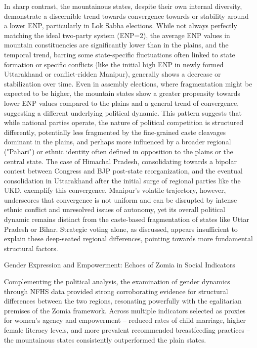 In sharp contrast, the mountainous states, despite their own internal diversity, demonstrate a discernible trend towards convergence towards or stability around a lower ENP, particularly in Lok Sabha elections. While not always perfectly matching the ideal two-party system (ENP=2), the average ENP values in mountain constituencies are significantly lower than in the plains, and the temporal trend, barring some state-specific fluctuations often linked to state formation or specific conflicts (like the initial high ENP in newly formed Uttarakhand or conflict-ridden Manipur), generally shows a decrease or stabilization over time. Even in assembly elections, where fragmentation might be expected to be higher, the mountain states show a greater propensity towards lower ENP values compared to the plains and a general trend of convergence, suggesting a different underlying political dynamic. This pattern suggests that while national parties operate, the nature of political competition is structured differently, potentially less fragmented by the fine-grained caste cleavages dominant in the plains, and perhaps more influenced by a broader regional ("Pahari") or ethnic identity often defined in opposition to the plains or the central state. The case of Himachal Pradesh, consolidating towards a bipolar contest between Congress and BJP post-state reorganization, and the eventual consolidation in Uttarakhand after the initial surge of regional parties like the UKD, exemplify this convergence. Manipur's volatile trajectory, however, underscores that convergence is not uniform and can be disrupted by intense ethnic conflict and unresolved issues of autonomy, yet its overall political dynamic remains distinct from the caste-based fragmentation of states like Uttar Pradesh or Bihar. Strategic voting alone, as discussed, appears insufficient to explain these deep-seated regional differences, pointing towards more fundamental structural factors.

Gender Expression and Empowerment: Echoes of Zomia in Social Indicators

Complementing the political analysis, the examination of gender dynamics through NFHS data provided strong corroborating evidence for structural differences between the two regions, resonating powerfully with the egalitarian premises of the Zomia framework. Across multiple indicators selected as proxies for women's agency and empowerment – reduced rates of child marriage, higher female literacy levels, and more prevalent recommended breastfeeding practices – the mountainous states consistently outperformed the plain states.

